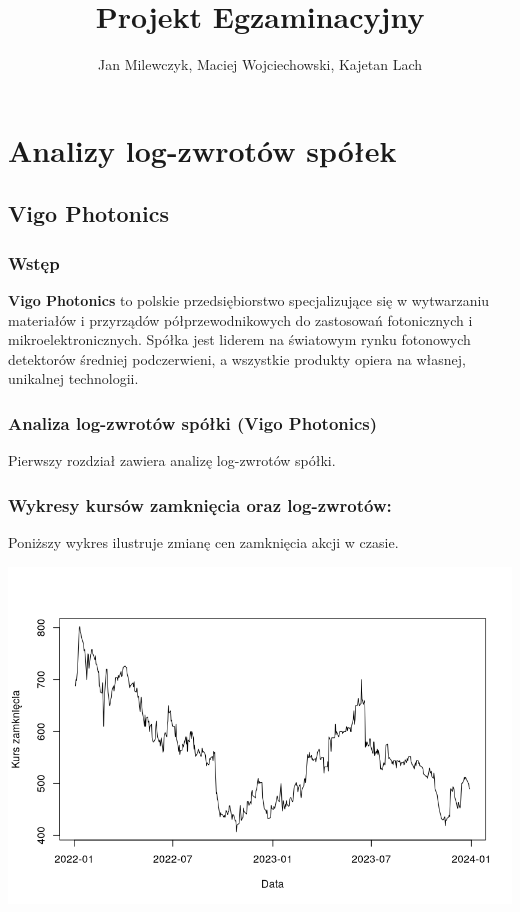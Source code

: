 \documentclass[a4paper,11pt]{article}
\title{Projekt Egzaminacyjny}
\author{Jan Milewczyk, Maciej Wojciechowski, Kajetan Lach}
\begin{document}
\maketitle

\section{Analizy log-zwrotów spółek}

\subsection{Vigo Photonics}

\subsubsection{Wstęp}
\textbf{Vigo Photonics} to polskie przedsiębiorstwo specjalizujące się w wytwarzaniu materiałów i przyrządów półprzewodnikowych do zastosowań fotonicznych i mikroelektronicznych. Spółka jest liderem na światowym rynku fotonowych detektorów średniej podczerwieni, a wszystkie produkty opiera na własnej, unikalnej technologii.

\subsubsection {Analiza log-zwrotów spółki (Vigo Photonics)}
Pierwszy rozdział zawiera analizę log-zwrotów spółki.


\newpage\subsubsection{Wykresy kursów zamknięcia oraz log-zwrotów:}
Poniższy wykres ilustruje zmianę cen zamknięcia akcji w czasie.

\centerline{\includegraphics[width=1\textwidth]{./Kajtek/img/kursy_zamkniecia_plot.png}}
\end{document}
